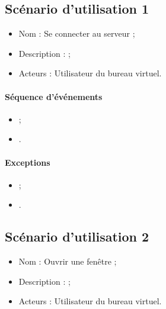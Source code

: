 




\subsection{Scénario d'utilisation 1}
\begin{itemize}
	\item Nom : Se connecter au serveur ;
	\item Description :  ;
	\item Acteurs : Utilisateur du bureau virtuel.
\end{itemize}

\paragraph{Séquence d'événements}
\begin{itemize}
	\item ;
	\item .
\end{itemize}

\paragraph{Exceptions}
\begin{itemize}
	\item ;
	\item .
\end{itemize}


\subsection{Scénario d'utilisation 2}
\begin{itemize}
	\item Nom : Ouvrir une fenêtre ;
	\item Description :  ;
	\item Acteurs : Utilisateur du bureau virtuel.
\end{itemize}

